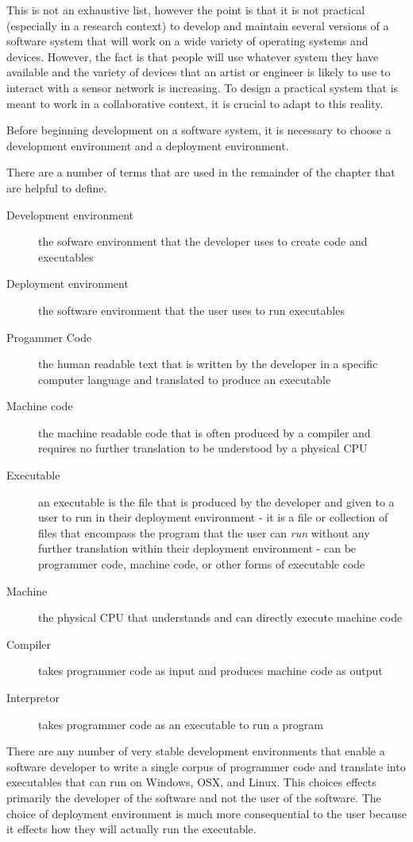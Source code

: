 This is not an exhaustive list, however the point is that it is not practical (especially in a research context) to develop and maintain several versions of a software system that will work on a wide variety of operating systems and devices. However, the fact is that people will use whatever system they have available and the variety of devices that an artist or engineer is likely to use to interact with a sensor network is increasing. To design a practical system that is meant to work in a collaborative context, it is crucial to adapt to this reality.

Before beginning development on a software system, it is necessary to choose a development environment and a deployment environment.

There are a number of terms that are used in the remainder of the chapter that are helpful to define.

\begin{description}
\item[Development environment] the sofware environment that the developer uses to create code and executables
\item[Deployment environment] the software environment that the user uses to run executables
\item[Progammer Code] the human readable text that is written by the developer in a specific computer language and translated to produce an executable
\item[Machine code] the machine readable code that is often produced by a compiler and requires no further translation to be understood by a physical CPU
\item[Executable] an executable is the file that is produced by the developer and given to a user to run in their deployment environment - it is a file or collection of files that encompass the program that the user can \emph{run} without any further translation within their deployment environment - can be programmer code, machine code, or other forms of executable code  
\item[Machine] the physical CPU that understands and can directly execute machine code
\item[Compiler] takes programmer code as input and produces machine code as output
\item[Interpretor] takes programmer code as an executable to run a program
\end{description}

There are any number of very stable development environments that enable a software developer to write a single corpus of programmer code and translate into executables that can run on Windows, OSX, and Linux. This choices effects primarily the developer of the software and not the user of the software. The choice of deployment environment is much more consequential to the user because it effects how they will actually run the executable.

